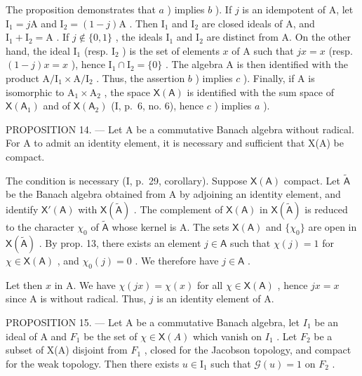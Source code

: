 The proposition demonstrates that \(a\) ) implies \(b\) ). If \(j\) is an idempotent of A, let \(\mathrm{I}_1 = j\mathrm{A}\) and \(\mathrm{I}_2 = (1 - j)\mathrm{A}\) . Then \(\mathrm{I}_1\) and \(\mathrm{I}_2\) are closed ideals of A, and \(\mathrm{I}_1 + \mathrm{I}_2 = \mathrm{A}\) . If \(j \notin \{0,1\}\) , the ideals \(\mathrm{I}_1\) and \(\mathrm{I}_2\) are distinct from A. On the other hand, the ideal \(\mathrm{I}_1\) (resp. \(\mathrm{I}_2\) ) is the set of elements \(x\) of A such that \(jx = x\) (resp. \((1 - j)x = x\) ), hence \(\mathrm{I}_1 \cap \mathrm{I}_2 = \{0\}\) . The algebra A is then identified with the product \(\mathrm{A} / \mathrm{I}_1 \times \mathrm{A} / \mathrm{I}_2\) . Thus, the assertion \(b\) ) implies \(c\) ). Finally, if A is isomorphic to \(\mathrm{A}_1 \times \mathrm{A}_2\) , the space \(\mathsf{X}(\mathsf{A})\) is identified with the sum space of \(\mathsf{X}(\mathsf{A}_1)\) and of \(\mathsf{X}(\mathsf{A}_2)\) (I, p.~6, no. 6), hence \(c\) ) implies \(a\) ).

PROPOSITION 14. --- Let A be a commutative Banach algebra without radical. For A to admit an identity element, it is necessary and sufficient that X(A) be compact.

The condition is necessary (I, p.~29, corollary). Suppose \(\mathsf{X}(\mathsf{A})\) compact. Let \(\widetilde{\mathsf{A}}\) be the Banach algebra obtained from A by adjoining an identity element, and identify \(\mathsf{X}'(\mathsf{A})\) with \(\mathsf{X}(\widetilde{\mathsf{A}})\) . The complement of \(\mathsf{X}(\mathsf{A})\) in \(\mathsf{X}(\widetilde{\mathsf{A}})\) is reduced to the character \(\chi_0\) of \(\widetilde{\mathsf{A}}\) whose kernel is A. The sets \(\mathsf{X}(\mathsf{A})\) and \(\{\chi_0\}\) are open in \(\mathsf{X}(\widetilde{\mathsf{A}})\) . By prop. 13, there exists an element \(j \in \mathsf{A}\) such that \(\chi(j) = 1\) for \(\chi \in \mathsf{X}(\mathsf{A})\) , and \(\chi_0(j) = 0\) . We therefore have \(j \in \mathsf{A}\) .

Let then \(x\) in A. We have \(\chi(jx) = \chi(x)\) for all \(\chi \in \mathsf{X}(\mathsf{A})\) , hence \(jx = x\) since A is without radical. Thus, \(j\) is an identity element of A.

PROPOSITION 15. --- Let A be a commutative Banach algebra, let \(I_{1}\) be an ideal of A and \(F_{1}\) be the set of \(\chi \in \mathsf{X}(A)\) which vanish on \(I_{1}\) . Let \(F_{2}\) be a subset of X(A) disjoint from \(F_{1}\) , closed for the Jacobson topology, and compact for the weak topology. Then there exists \(u \in \text{I}_{1}\) such that \(\mathcal{G}(u) = 1\) on \(F_{2}\) .

